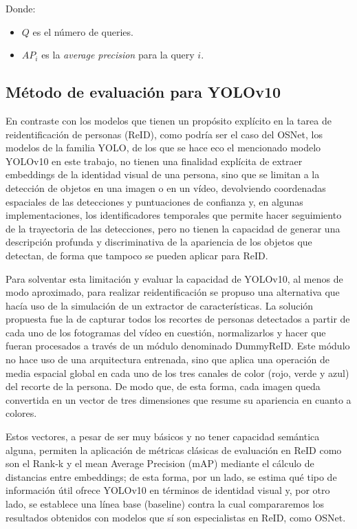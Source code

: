 \documentclass[12pt, a4paper, twoside]{article}
\begin{document}
	Donde:
	
	\begin{itemize}
		\item $Q$ es el número de queries.
		\item $AP_i$ es la \textit{average precision} para la query $i$.
	\end{itemize}
	
 	\subsection{Método de evaluación para YOLOv10} \cite{7410490}
 	
 	En contraste con los modelos que tienen un propósito explícito en la tarea de reidentificación de personas (ReID), como podría ser el caso del OSNet, los modelos de la familia YOLO, de los que se hace eco el mencionado modelo YOLOv10 en este trabajo, no tienen una finalidad explícita de extraer embeddings de la identidad visual de una persona, sino que se limitan a la detección de objetos en una imagen o en un vídeo, devolviendo coordenadas espaciales de las detecciones y puntuaciones de confianza y, en algunas implementaciones, los identificadores temporales que permite hacer seguimiento de la trayectoria de las detecciones, pero no tienen la capacidad de generar una descripción profunda y discriminativa de la apariencia de los objetos que detectan, de forma que tampoco se pueden aplicar para ReID.
 	
 	Para solventar esta limitación y evaluar la capacidad de YOLOv10, al menos de modo aproximado, para realizar reidentificación se propuso una alternativa que hacía uso de la simulación de un extractor de características. La solución propuesta fue la de capturar todos los recortes de personas detectados a partir de cada uno de los fotogramas del vídeo en cuestión, normalizarlos y hacer que fueran procesados a través de un módulo denominado DummyReID. Este módulo no hace uso de una arquitectura entrenada, sino que aplica una operación de media espacial global en cada uno de los tres canales de color (rojo, verde y azul) del recorte de la persona. De modo que, de esta forma, cada imagen queda convertida en un vector de tres dimensiones que resume su apariencia en cuanto a colores.
 	
 	Estos vectores, a pesar de ser muy básicos y no tener capacidad semántica alguna, permiten la aplicación de métricas clásicas de evaluación en ReID como son el Rank-k y el mean Average Precision (mAP) mediante el cálculo de distancias entre embeddings; de esta forma, por un lado, se estima qué tipo de información útil ofrece YOLOv10 en términos de identidad visual y, por otro lado, se establece una línea base (baseline) contra la cual compararemos los resultados obtenidos con modelos que sí son especialistas en ReID, como OSNet.
 	
\end{document}
